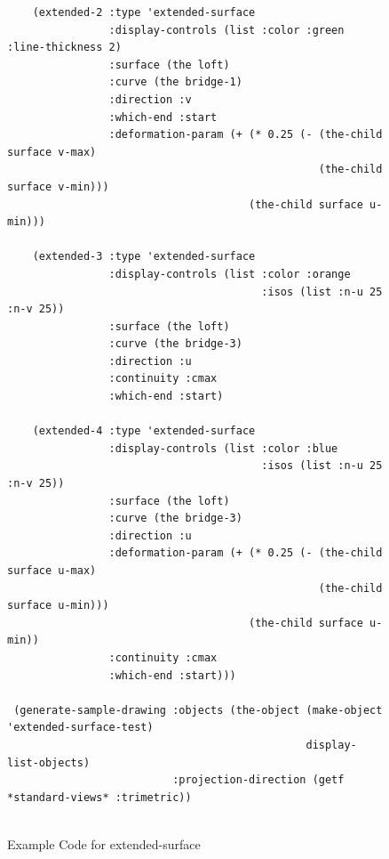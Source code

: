 \documentclass [11pt]{book}
\begin{document}
\begin{itemize}
\begin{figure}
\begin{lrbox}{\boxedverb}
\begin{minipage}{\linewidth}
{\begin{verbatim}
    (extended-2 :type 'extended-surface
                :display-controls (list :color :green :line-thickness 2)
                :surface (the loft)
                :curve (the bridge-1)
                :direction :v
                :which-end :start
                :deformation-param (+ (* 0.25 (- (the-child surface v-max)
                                                 (the-child surface v-min)))
                                      (the-child surface u-min)))
   
    (extended-3 :type 'extended-surface
                :display-controls (list :color :orange
                                        :isos (list :n-u 25 :n-v 25))
                :surface (the loft)
                :curve (the bridge-3)
                :direction :u
                :continuity :cmax
                :which-end :start)
   
    (extended-4 :type 'extended-surface
                :display-controls (list :color :blue 
                                        :isos (list :n-u 25 :n-v 25))
                :surface (the loft)
                :curve (the bridge-3)
                :direction :u
                :deformation-param (+ (* 0.25 (- (the-child surface u-max)
                                                 (the-child surface u-min)))
                                      (the-child surface u-min))
                :continuity :cmax
                :which-end :start)))              
                  
 (generate-sample-drawing :objects (the-object (make-object 'extended-surface-test)
                                               display-list-objects)
                          :projection-direction (getf *standard-views* :trimetric))


\end{verbatim}}
\end{minipage}
\end{lrbox}
\fbox{\usebox{\boxedverb}}

\caption{Example Code for extended-surface}

\label{fig:example-code-extended-surface}

\end{figure}


\end{itemize}
\end{document}
